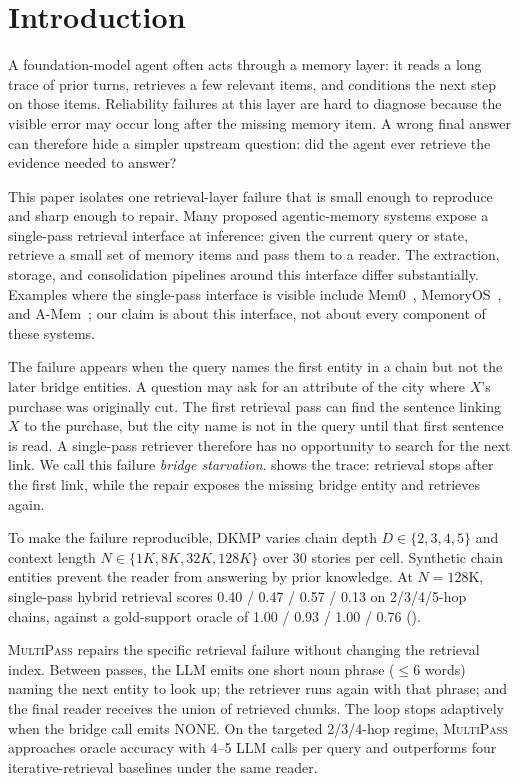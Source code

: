 \documentclass{article}
\theoremstyle{plain}
\theoremstyle{definition}
\newcommand{\ours}{\textsc{MultiPass}}
\newcommand{\dkmp}{\textsc{DKMP}}
\begin{document}
\section{Introduction}\label{sec:intro}

A foundation-model agent often acts through a memory layer: it reads a
long trace of prior turns, retrieves a few relevant items, and conditions
the next step on those items. Reliability failures at this layer are hard
to diagnose because the visible error may occur long after the missing
memory item. A wrong final answer can therefore hide a simpler upstream
question: did the agent ever retrieve the evidence needed to answer?

This paper isolates one retrieval-layer failure that is small enough to
reproduce and sharp enough to repair. Many proposed agentic-memory systems
expose a single-pass retrieval interface at inference: given the current
query or state, retrieve a small set of memory items and pass them to a
reader. The extraction, storage, and consolidation pipelines around this
interface differ substantially. Examples where the single-pass interface
is visible include Mem0~\cite{mem0blog2026},
MemoryOS~\cite{memoryos2025emnlp}, and A-Mem~\cite{xu2025amem}; our claim
is about this interface, not about every component of these systems.

The failure appears when the query names the first entity in a chain but
not the later bridge entities. A question may ask for an attribute of the
city where $X$'s purchase was originally cut. The first retrieval pass can
find the sentence linking $X$ to the purchase, but the city name is not in
the query until that first sentence is read. A single-pass retriever
therefore has no opportunity to search for the next link. We call this
failure \emph{bridge starvation}.  shows the trace:
retrieval stops after the first link, while the repair exposes the missing
bridge entity and retrieves again.

To make the failure reproducible, \dkmp{} varies chain depth
$D \in \{2,3,4,5\}$ and context length
$N \in \{1K,8K,32K,128K\}$ over 30 stories per cell. Synthetic chain
entities prevent the reader from answering by prior knowledge. At
$N{=}128$K, single-pass hybrid retrieval scores 0.40 / 0.47 / 0.57 / 0.13
on 2/3/4/5-hop chains, against a gold-support oracle of
1.00 / 0.93 / 1.00 / 0.76 ().

\ours{} repairs the specific retrieval failure without changing the
retrieval index. Between passes, the LLM emits one short noun phrase
($\le 6$ words) naming the next entity to look up; the retriever runs
again with that phrase; and the final reader receives the union of
retrieved chunks. The loop stops adaptively when the bridge call emits
NONE. On the targeted 2/3/4-hop regime, \ours{} approaches oracle accuracy
with 4--5 LLM calls per query and outperforms four iterative-retrieval
baselines under the same reader.
\end{document}
